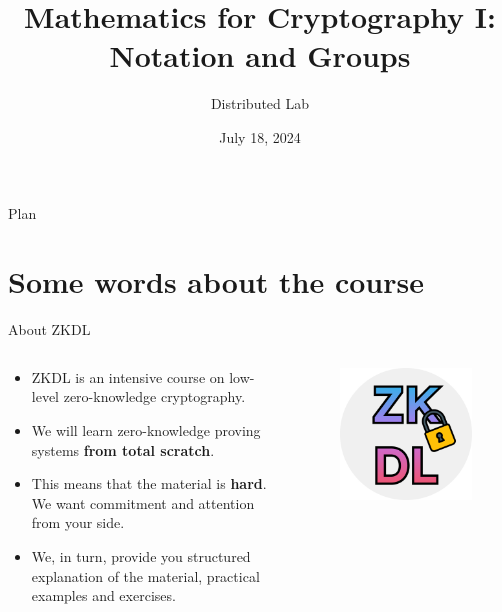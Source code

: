 \documentclass{beamer}
\title[Mathematics I]{\textbf{Mathematics for Cryptography I: Notation and Groups}}
\author{Distributed Lab}
\date{July 18, 2024}
\begin{document}
    \frame {
      \titlepage
    }
  
    \begin{frame}{Plan}
      \tableofcontents
    \end{frame}

    \section{Some words about the course}
    \begin{frame}{About ZKDL} 

      \begin{columns}
        \begin{column}{0.7\textwidth}
          \begin{itemize}
            \item ZKDL is an intensive course on low-level zero-knowledge cryptography.
            \item We will learn zero-knowledge proving systems \textbf{from total scratch}.
            \item This means that the material is \textbf{hard}. We want commitment and attention from your side.
            \item We, in turn, provide you structured explanation of the material, practical examples and exercises.
          \end{itemize}
        \end{column}
        \begin{column}{0.3\textwidth}
            \begin{figure}
            \centering
                \includegraphics[width=1\textwidth]{images/logo.png}
            \end{figure}
        \end{column}
        \end{columns}


\end{frame}
\end{document}
